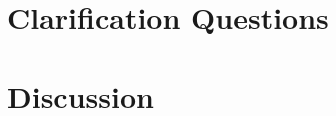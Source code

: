 \section{Clarification Questions}

\begin{QandA}
    \item 
    \begin{answered}
        \textit{}
    \end{answered}
    
\end{QandA}

\section{Discussion}
\label{max_manhattan:sec:discussion}

